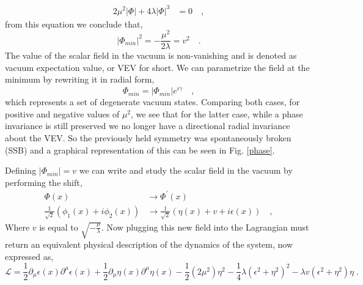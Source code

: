 \documentclass[12pt]{article}
\begin{document}
%
\begin{align}
2  \mu^2 |\Phi|+ 4 \lambda |\Phi|^3 & = 0  \quad , 
\end{align}
%
from this equation we conclude that,
%
\begin{equation}
|\Phi_{min}|^2 = -\frac{\mu^2}{2 \lambda} = v^2  \quad .
\end{equation}
%
The value of the scalar field in the vacuum is non-vanishing and is denoted as vacuum expectation value, or VEV for short. 
%
We can parametrize the field at the minimum by rewriting it in radial form, 
%
\begin{equation}
\Phi_{min} = | \Phi_{min} | e^{i \gamma} \quad , 
\end{equation}
%
which represents a set of degenerate vacuum states.
%
%
Comparing both cases, for positive and negative values of  $\mu^2$, we see that for the latter case, while a phase invariance is still preserved we no longer have a directional radial invariance about the VEV. So the previously held symmetry was spontaneously broken (SSB) and a graphical representation of this can be seen in Fig. \ref{phase}.


Defining $| \Phi_{min} | = v$ we can write and study the scalar field in the vacuum by performing the shift,
%
\begin{align}
\Phi(x) & \longrightarrow \Phi^\prime (x) \nonumber \\ 
\frac{1}{\sqrt{2}} \left( \phi_1 (x) + i \phi_2 (x) \right) & \longrightarrow  \frac{1}{\sqrt{2}} \left( \eta(x) + v + i \epsilon(x) \right)  \quad , 
\end{align}
%
Where $v$ is equal to $\sqrt{-\frac{\mu}{\lambda}}$. Now plugging this new field into the Lagrangian must return an equivalent physical description of the dynamics of the system, now expressed as,
%
%
\begin{equation}
 \mathcal{L} = \frac{1}{2} \partial_\mu \epsilon(x) \partial^\mu \epsilon(x) + \frac{1}{2}\partial_\mu \eta(x) \partial^\mu \eta(x)  - \frac{1}{2} ( 2\mu ^2)  \eta^2 - \frac{1}{4} \lambda (\epsilon^2 + \eta^2)^2 - \lambda  v  (\epsilon^2 + \eta^2) \eta \; .
\end{equation}
 
\end{document}
